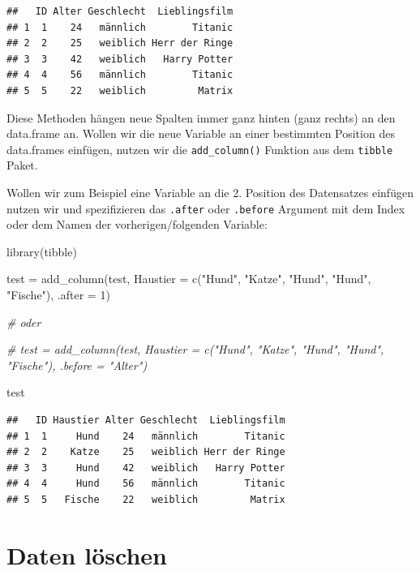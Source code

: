 \documentclass[
]{book}
\newenvironment{Shaded}{\begin{snugshade}}{\end{snugshade}}
\newcommand{\AttributeTok}[1]{\textcolor[rgb]{0.77,0.63,0.00}{#1}}
\newcommand{\CommentTok}[1]{\textcolor[rgb]{0.56,0.35,0.01}{\textit{#1}}}
\newcommand{\DecValTok}[1]{\textcolor[rgb]{0.00,0.00,0.81}{#1}}
\newcommand{\FunctionTok}[1]{\textcolor[rgb]{0.00,0.00,0.00}{#1}}
\newcommand{\NormalTok}[1]{#1}
\newcommand{\OtherTok}[1]{\textcolor[rgb]{0.56,0.35,0.01}{#1}}
\newcommand{\StringTok}[1]{\textcolor[rgb]{0.31,0.60,0.02}{#1}}
\begin{document}
\begin{verbatim}
##   ID Alter Geschlecht  Lieblingsfilm
## 1  1    24   männlich        Titanic
## 2  2    25   weiblich Herr der Ringe
## 3  3    42   weiblich   Harry Potter
## 4  4    56   männlich        Titanic
## 5  5    22   weiblich         Matrix
\end{verbatim}

Diese Methoden hängen neue Spalten immer ganz hinten (ganz rechts) an den data.frame an.
Wollen wir die neue Variable an einer bestimmten Position des data.frames einfügen, nutzen wir die \texttt{add\_column()} Funktion aus dem \texttt{tibble} Paket.

Wollen wir zum Beispiel eine Variable an die 2. Position des Datensatzes einfügen nutzen wir und spezifizieren das \texttt{.after} oder \texttt{.before} Argument mit dem Index oder dem Namen der vorherigen/folgenden Variable:

\begin{Shaded}
\begin{Highlighting}[]
\FunctionTok{library}\NormalTok{(tibble)}

\NormalTok{test }\OtherTok{=} \FunctionTok{add\_column}\NormalTok{(test, }\AttributeTok{Haustier =} \FunctionTok{c}\NormalTok{(}\StringTok{"Hund"}\NormalTok{, }\StringTok{"Katze"}\NormalTok{, }\StringTok{"Hund"}\NormalTok{, }\StringTok{"Hund"}\NormalTok{, }\StringTok{"Fische"}\NormalTok{),  }\AttributeTok{.after =} \DecValTok{1}\NormalTok{)}

\CommentTok{\# oder }

\CommentTok{\# test = add\_column(test, Haustier = c("Hund", "Katze", "Hund", "Hund", "Fische"),  .before = "Alter")}

\NormalTok{test}
\end{Highlighting}
\end{Shaded}

\begin{verbatim}
##   ID Haustier Alter Geschlecht  Lieblingsfilm
## 1  1     Hund    24   männlich        Titanic
## 2  2    Katze    25   weiblich Herr der Ringe
## 3  3     Hund    42   weiblich   Harry Potter
## 4  4     Hund    56   männlich        Titanic
## 5  5   Fische    22   weiblich         Matrix
\end{verbatim}

\hypertarget{daten-luxf6schen}{%
\section{Daten löschen}\label{daten-luxf6schen}}
\end{document}
